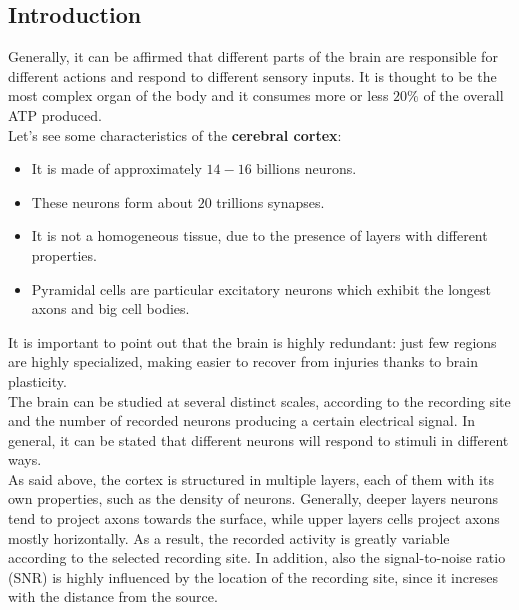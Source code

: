 \subsection{Introduction}
Generally, it can be affirmed that different parts of the brain are responsible
for different actions and respond to different sensory inputs. It is
thought to be the most complex organ of the body and it consumes more or less
\(20\%\) of the overall ATP produced.\\
Let's see some characteristics of the \textbf{cerebral cortex}:
\begin{itemize}
    \item It is made of approximately \(14-16\) billions neurons.
    \item These neurons form about \(20\) trillions synapses.
    \item It is not a homogeneous tissue, due to the presence of layers with
          different properties.
    \item Pyramidal cells are particular excitatory neurons which exhibit the longest
          axons and big cell bodies.
\end{itemize}
It is important to point out that the brain is highly redundant:
just few regions are highly specialized, making easier to recover from injuries
thanks to brain plasticity.\\
The brain can be studied at several distinct scales, according to the recording site
and the number of recorded neurons producing a certain electrical signal. In general,
it can be stated that different neurons will respond to stimuli in different ways.\\
As said above, the cortex is structured in multiple layers, each of them with its own
properties, such as the density of neurons. Generally, deeper layers neurons
tend to project axons towards the surface, while upper layers cells project axons
mostly horizontally. As a result, the recorded activity is greatly variable according
to the selected recording site. In addition, also the signal-to-noise ratio (SNR) is
highly influenced by the location of the recording site, since it increses with the
distance from the source.

